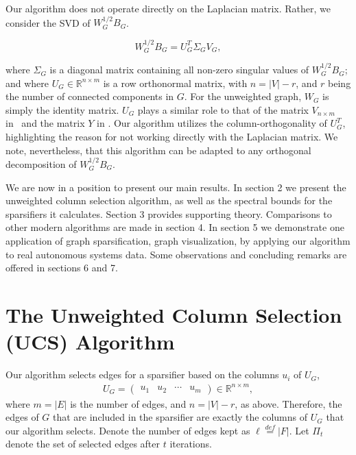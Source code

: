\documentclass[final,leqno,onefignum,onetabnum]{siamltex1213}
\begin{document}
Our algorithm does not operate directly on the Laplacian matrix.  Rather, we consider the SVD of $W_G^{1/2} B_G$.

\begin{equation}\label{PolarMat}
W_G^{1/2} B_G = U_G^T \Sigma_G V_G, 
\end{equation}

\noindent where $\Sigma_G$ is a diagonal matrix containing all non-zero singular values of $W_G^{1/2} B_G$; and where $U_G \in \mathbb{R}^{n\times m}$ is a row orthonormal matrix, with $n = |V|-r$, and $r$ being the number of connected components in $G$. For the unweighted graph, $W_G$ is simply the
identity matrix. $U_G$ plays a similar role to that of the matrix
$V_{n\times m}$ in~\cite{ramanujansparse} and the matrix $Y$ in \cite{fasterSub}.  Our algorithm utilizes the column-orthogonality of $U_G^T$, highlighting the reason for not working directly with the Laplacian matrix.  We note, nevertheless, that this algorithm can be adapted to any orthogonal decomposition of $W_G^{1/2} B_G$.

We are now in a position to present our main results.  In section 2 we present the unweighted column selection algorithm, as well as the spectral bounds for the sparsifiers it calculates.  Section 3 provides supporting theory.  Comparisons to other modern algorithms are made in section 4.  In section 5 we demonstrate one application of graph sparsification, graph visualization, by applying our algorithm to real autonomous systems data.  Some observations and concluding remarks are offered in sections 6 and 7.

\section{The Unweighted Column Selection (UCS) Algorithm}
Our algorithm selects edges for a sparsifier based on the columns ${u}_i$ of $U_G$,
\begin{eqnarray}U_G=\left(\begin{array}{cccc}u_1 & u_2 & \cdots & u_m\end{array}\right)\in\mathbb{R}^{n\times m},\nonumber\end{eqnarray}
where $m = \left| E \right|$ is the number of edges, and $n = \left| V
\right|-r$, as above. Therefore, the edges of $G$ that
are included in the sparsifier are exactly the columns of $U_G$ that our algorithm selects. Denote
the number of edges kept as $\ell \stackrel{def}= \left| F \right|$.  Let $\Pi_t$ denote the set of selected edges after $t$ iterations.
\end{document}
